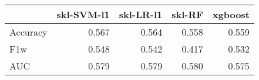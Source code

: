 \begin{tabular}{lrrrr}
\toprule
{} &  skl-SVM-l1 &  skl-LR-l1 &  skl-RF &  xgboost \\
\midrule
Accuracy &       0.567 &      0.564 &   0.558 &    0.559 \\
F1w      &       0.548 &      0.542 &   0.417 &    0.532 \\
AUC      &       0.579 &      0.579 &   0.580 &    0.575 \\
\bottomrule
\end{tabular}
